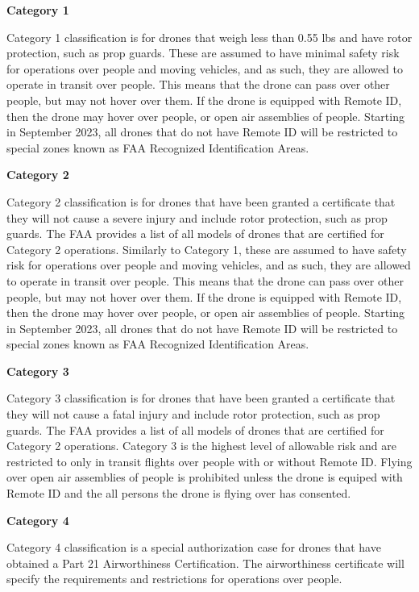 \documentclass[
  12pt,
]{book}
\begin{document}
\textbf{Category 1}

Category 1 classification is for drones that weigh less than 0.55 lbs and have rotor protection, such as prop guards. These are assumed to have minimal safety risk for operations over people and moving vehicles, and as such, they are allowed to operate in transit over people. This means that the drone can pass over other people, but may not hover over them. If the drone is equipped with Remote ID, then the drone may hover over people, or open air assemblies of people. Starting in September 2023, all drones that do not have Remote ID will be restricted to special zones known as FAA Recognized Identification Areas.

\textbf{Category 2}

Category 2 classification is for drones that have been granted a certificate that they will not cause a severe injury and include rotor protection, such as prop guards. The FAA provides a list of all models of drones that are certified for Category 2 operations. Similarly to Category 1, these are assumed to have safety risk for operations over people and moving vehicles, and as such, they are allowed to operate in transit over people. This means that the drone can pass over other people, but may not hover over them. If the drone is equipped with Remote ID, then the drone may hover over people, or open air assemblies of people. Starting in September 2023, all drones that do not have Remote ID will be restricted to special zones known as FAA Recognized Identification Areas.

\textbf{Category 3}

Category 3 classification is for drones that have been granted a certificate that they will not cause a fatal injury and include rotor protection, such as prop guards. The FAA provides a list of all models of drones that are certified for Category 2 operations. Category 3 is the highest level of allowable risk and are restricted to only in transit flights over people with or without Remote ID. Flying over open air assemblies of people is prohibited unless the drone is equiped with Remote ID and the all persons the drone is flying over has consented.

\textbf{Category 4}

Category 4 classification is a special authorization case for drones that have obtained a Part 21 Airworthiness Certification. The airworthiness certificate will specify the requirements and restrictions for operations over people.
\end{document}
